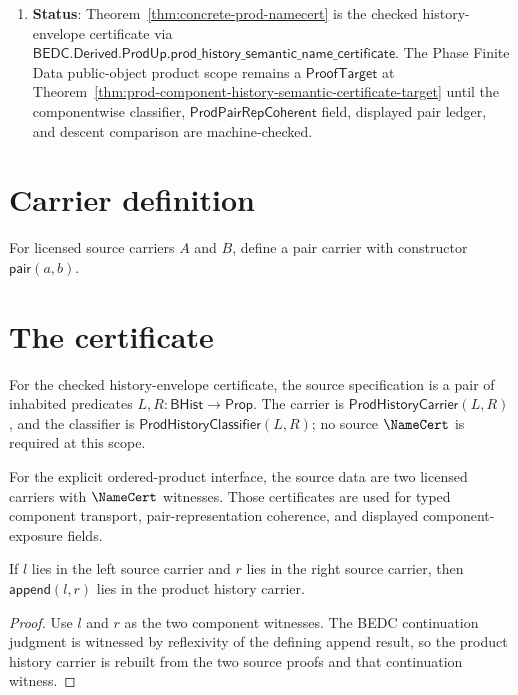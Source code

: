 \begin{enumerate}
  \item \textbf{Status}: Theorem~\ref{thm:concrete-prod-namecert} is the checked history-envelope certificate via $\mathsf{BEDC.Derived.ProdUp.prod\_history\_semantic\_name\_certificate}$. The Phase Finite Data public-object product scope remains a $\mathsf{ProofTarget}$ at Theorem~\ref{thm:prod-component-history-semantic-certificate-target} until the componentwise classifier, $\mathsf{ProdPairRepCoherent}$ field, displayed pair ledger, and descent comparison are machine-checked.
\end{enumerate}

\section{Carrier definition}

\begin{definition}
\label{def:prod-carrier}
For licensed source carriers \(A\) and \(B\), define a pair carrier with constructor \(\mathsf{pair}(a,b)\).
\end{definition}

\section{The certificate}

\begin{definition}
\label{def:prod-source-specification}
For the checked history-envelope certificate, the source specification is a
pair of inhabited predicates $L,R:\mathsf{BHist}\to\mathsf{Prop}$. The carrier
is $\mathsf{ProdHistoryCarrier}(L,R)$, and the classifier is
$\mathsf{ProdHistoryClassifier}(L,R)$; no source $\NameCert$ is required at
this scope.

For the explicit ordered-product interface, the source data are two licensed
carriers with $\NameCert$ witnesses. Those certificates are used for typed
component transport, pair-representation coherence, and displayed component-exposure fields.
\end{definition}

\begin{theorem}
\label{thm:prod-history-carrier-append-intro}
If \(l\) lies in the left source carrier and \(r\) lies in the right source
carrier, then \(\mathsf{append}(l,r)\) lies in the product history carrier.
\end{theorem}
\begin{proof}
Use \(l\) and \(r\) as the two component witnesses. The BEDC continuation
judgment is witnessed by reflexivity of the defining append result, so the
product history carrier is rebuilt from the two source proofs and that
continuation witness.
\end{proof}

